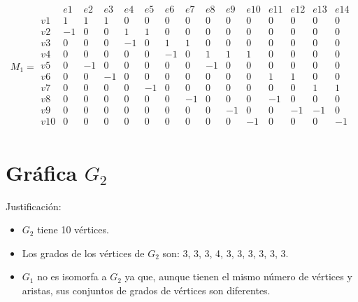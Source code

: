 \documentclass{article}
\begin{document}
\setcounter{MaxMatrixCols}{20}
\[
M_1 =
\begin{array}{c|cccccccccccccc}
    & e1 & e2 & e3 & e4 & e5 & e6 & e7 & e8 & e9 & e10 & e11 & e12 & e13 & e14 \\
\hline
v1 & 1  & 1  & 1  & 0  & 0  & 0  & 0  & 0  & 0  & 0  & 0  & 0  & 0  & 0   \\
v2 & -1 & 0  & 0  & 1  & 1  & 0  & 0  & 0  & 0  & 0  & 0  & 0  & 0  & 0   \\
v3 & 0  & 0  & 0  & -1 & 0  & 1  & 1  & 0  & 0  & 0  & 0  & 0  & 0  & 0   \\
v4 & 0  & 0  & 0  & 0  & 0  & -1 & 0  & 1  & 1  & 1  & 0  & 0  & 0  & 0   \\
v5 & 0  & -1 & 0  & 0  & 0  & 0  & 0  & -1 & 0  & 0  & 0  & 0  & 0  & 0   \\
v6 & 0  & 0  & -1 & 0  & 0  & 0  & 0  & 0  & 0  & 0  & 1  & 1  & 0  & 0   \\
v7 & 0  & 0  & 0  & 0  & -1 & 0  & 0  & 0  & 0  & 0  & 0  & 0  & 1  & 1   \\
v8 & 0  & 0  & 0  & 0  & 0  & 0  & -1 & 0  & 0  & 0  & -1 & 0  & 0  & 0   \\
v9 & 0  & 0  & 0  & 0  & 0  & 0  & 0  & 0  & -1 & 0  & 0  & -1 & -1 & 0   \\
v10& 0  & 0  & 0  & 0  & 0  & 0  & 0  & 0  & 0  & -1 & 0  & 0  & 0  & -1  \\
\end{array}
\]

\section*{Gráfica \( G_2 \)}


Justificación:
\begin{itemize}
    \item \( G_2 \) tiene 10 vértices.
    \item Los grados de los vértices de \( G_2 \) son: 3, 3, 3, 4, 3, 3, 3, 3, 3, 3.
    \item \( G_1 \) no es isomorfa a \( G_2 \) ya que, aunque tienen el mismo número de vértices y aristas, sus conjuntos de grados de vértices son diferentes.
\end{itemize}
\end{document}
